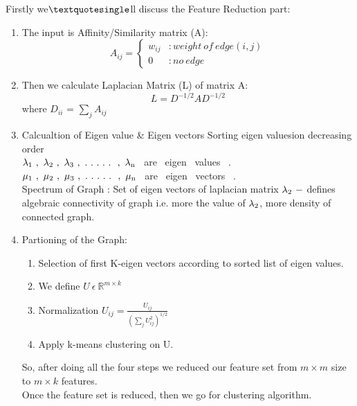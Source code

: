 \documentclass{report}
\begin{document}
Firstly we\(\textquotesingle \)ll discuss the Feature Reduction part:
\begin{enumerate}[label=\alph*).]
\item The input is Affinity/Similarity matrix (A):
\[A_{ij}  =    \begin{cases} 
      w_{ij} & :weight \ of \ edge(i,j) \\
      0 & :no \  edge 
   \end{cases}
\]
\item Then we calculate Laplacian Matrix (L) of matrix A:
\[ L = D^{-1/2} A D^{-1/2} \]
\quad \quad where \(D_{ii}\) = \(\sum\limits_{j}^{} A_{ij}\)\\
\item Calcualtion of Eigen value \& Eigen vectors
Sorting eigen valuesion decreasing order\\
\(\lambda \textsubscript{1} \ , \ \lambda \textsubscript{2} \ , \ \lambda \textsubscript{3} \ , \ . \ . \ . \ . \ . \  \ , \ \lambda \textsubscript{n}\) \ are \ eigen \ values \ .\\
\(\mu \textsubscript{1} \ , \ \mu \textsubscript{2} \ , \ \mu \textsubscript{3} \ , \ . \ . \ . \ . \ . \  \ , \ \mu \textsubscript{n}\) \ are \ eigen \ vectors \ .\\
\linebreak
Spectrum of Graph : Set of eigen vectors of laplacian matrix
\( \lambda \textsubscript{2} \ - \) defines algebraic connectivity of graph i.e. more the value of \( \lambda \textsubscript{2}\), more density of connected graph.\\
\item Partioning of the Graph:
\begin{enumerate}[label=\roman*).]
\item Selection of first K-eigen vectors according to sorted list of eigen values.
\item We define \(U \  \epsilon  \  \mathbb{R}^{m\times k}\) 
\item Normalization \(U_{ij} = \frac{U_{ij}}{(\sum\limits_{j}^{} U_{ij}^2 )^{1/2}}\)
\item Apply k-means clustering on U.\\
\end{enumerate}
So, after doing all the four steps we reduced our feature set from \(m\times m\) size to \(m\times k\) features.\\
Once the feature set is reduced, then we go for clustering algorithm.\\
\end{enumerate}
\end{document}
